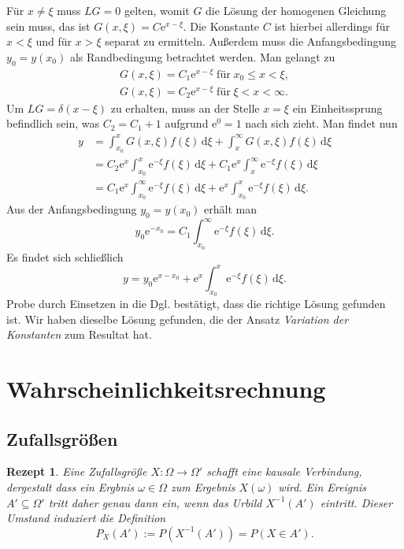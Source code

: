 \documentclass[a4paper,10pt,fleqn,twocolumn,twoside,dvipdfmx]{scrartcl}
\theoremstyle{rmbox}
\newtheorem{Rezept}{Rezept}[section]
\newcommand{\ee}{\mathrm{e}}
\begin{document}
Für $x\ne \xi$ muss $LG = 0$ gelten, womit $G$ die Lösung der homogenen
Gleichung sein muss, das ist $G(x,\xi)=C\ee^{x-\xi}$. Die Konstante $C$ ist
hierbei allerdings für $x<\xi$ und für $x>\xi$ separat zu ermitteln.
Außerdem muss die Anfangsbedingung $y_0=y(x_0)$ als Randbedingung
betrachtet werden. Man gelangt zu
\begin{gather*}
G(x,\xi) = C_1\ee^{x-\xi}\;\text{für}\; x_0\le x<\xi,\\
G(x,\xi) = C_2\ee^{x-\xi}\;\text{für}\; \xi < x < \infty.
\end{gather*}
Um $LG=\delta(x-\xi)$ zu erhalten, muss an der Stelle $x=\xi$ ein
Einheitssprung befindlich sein, was $C_2 = C_1 + 1$ aufgrund
$\ee^0=1$ nach sich zieht. Man findet nun
\begin{align*}
y &= \int_{x_0}^x G(x,\xi)f(\xi)\,\mathrm d\xi + \int_x^\infty G(x,\xi)f(\xi)\,\mathrm d\xi\\
&= C_2\ee^x\int_{x_0}^x \ee^{-\xi} f(\xi)\,\mathrm d\xi + C_1\ee^x\int_x^\infty \ee^{-\xi}f(\xi)\,\mathrm d\xi\\
&= C_1\ee^x\int_{x_0}^\infty \ee^{-\xi} f(\xi)\,\mathrm d\xi + \ee^x\int_{x_0}^x\ee^{-\xi} f(\xi)\,\mathrm d\xi.
\end{align*}
Aus der Anfangsbedingung $y_0=y(x_0)$ erhält man
\[y_0\ee^{-x_0} = C_1\int_{x_0}^\infty \ee^{-\xi} f(\xi)\,\mathrm d\xi.\]
Es findet sich schließlich
\[y = y_0\ee^{x-x_0} + \ee^x\int_{x_0}^x \ee^{-\xi}f(\xi)\,\mathrm d\xi.\]
Probe durch Einsetzen in die Dgl. bestätigt, dass die richtige
Lösung gefunden ist. Wir haben dieselbe Lösung gefunden, die der
Ansatz \emph{Variation der Konstanten} zum Resultat hat.

\clearpage
\section{Wahrscheinlichkeitsrechnung}

\subsection{Zufallsgrößen}

\begin{Rezept}
Eine Zufallsgröße $X\colon\Omega\to\Omega'$ schafft eine kausale
Verbindung, dergestalt dass ein Ergbnis $\omega\in\Omega$ zum
Ergebnis $X(\omega)$ wird. Ein Ereignis $A'\subseteq\Omega'$
tritt daher genau dann ein, wenn das Urbild $X^{-1}(A')$ eintritt.
Dieser Umstand induziert die Definition
\[P_X(A') := P(X^{-1}(A')) = P(X\in A').\]
\end{Rezept}
\end{document}
